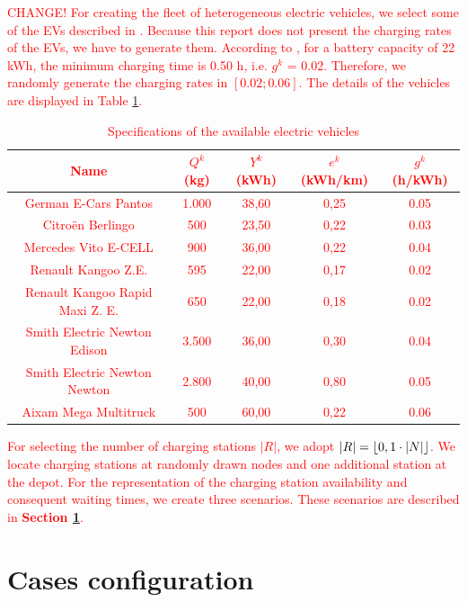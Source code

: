 \documentclass[11pt]{article}
\DeclarePairedDelimiter\floor{\lfloor}{\rfloor}
\begin{document}
\textcolor{red}{CHANGE! For creating the fleet of heterogeneous electric vehicles, we select some of the EVs described in \cite{mobility2013}. Because this report does not present the charging rates of the EVs, we have to generate them. According to \citep{Montoya2017}, for a battery capacity of 22 kWh, the minimum charging time is 0.50 h, i.e. $g^k$ = 0.02. Therefore, we randomly generate the charging rates in $[0.02;0.06]$. The details of the vehicles are displayed in Table \ref{table:vehicles}.
\begin{table}[H]
	\begin{center}
	\begin{tabular}{c c c c c}
	\toprule
	Name & $Q^k$ (kg) &  $Y^k$ (kWh) & $e^k$ (kWh/km) & $g^k$ (h/kWh)\\ \midrule
	German E-Cars Pantos & 1.000 & 38,60  & 0,25 & 0.05\\
	Citro\"{e}n Berlingo &500 &23,50 &0,22 & 0.03 \\
	Mercedes Vito E-CELL & 900 & 36,00& 0,22 & 0.04\\
	Renault Kangoo Z.E. & 595 & 22,00 & 0,17 & 0.02 \\
	Renault Kangoo Rapid Maxi Z. E. & 650  & 22,00 & 0,18 & 0.02 \\
	Smith Electric Newton Edison & 3.500 & 36,00 & 0,30 & 0.04\\
	Smith Electric Newton Newton & 2.800 & 40,00 & 0,80 & 0.05 \\
	Aixam Mega Multitruck & 500 & 60,00 & 0,22 & 0.06\\
	\bottomrule
	\end{tabular}
	\end{center}
\caption{Specifications of the available electric vehicles}
\label{table:vehicles}
\end{table}
For selecting the number of charging stations $|R|$, we adopt $|R| = \floor{0,1 \cdot |N|}$. We locate charging stations at randomly drawn nodes and one additional station at the depot. For the representation of the charging station availability and consequent waiting times, we create three scenarios. These scenarios are described in \textbf{Section \ref{section:cases}}.}

\section{Cases configuration}
\label{section:cases}
\end{document}
